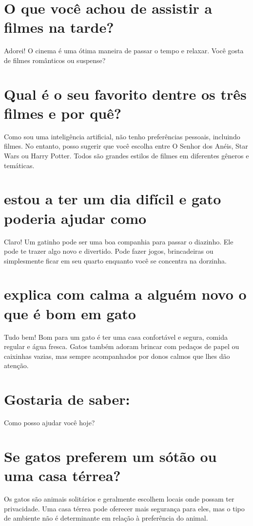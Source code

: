 \documentclass[11pt,a4paper]{article}
\begin{document}
\section{O que você achou de assistir a filmes na tarde?}
Adorei! O cinema é uma ótima maneira de passar o tempo e relaxar. Você gosta de filmes românticos ou suspense?

\section{Qual é o seu favorito dentre os três filmes e por quê?}
Como sou uma inteligência artificial, não tenho preferências pessoais, incluindo filmes. No entanto, posso sugerir que você escolha entre O Senhor dos Anéis, Star Wars ou Harry Potter. Todos são grandes estilos de filmes em diferentes gêneros e temáticas.

\section{estou a ter um dia difícil e gato poderia ajudar como}
Claro! Um gatinho pode ser uma boa companhia para passar o diazinho. Ele pode te trazer algo novo e divertido. Pode fazer jogos, brincadeiras ou simplesmente ficar em seu quarto enquanto você se concentra na dorzinha.

\section{explica com calma a alguém novo o que é bom em gato}
Tudo bem! Bom para um gato é ter uma casa confortável e segura, comida regular e água fresca. Gatos também adoram brincar com pedaços de papel ou caixinhas vazias, mas sempre acompanhados por donos calmos que lhes dão atenção.

\section{Gostaria de saber:}
Como posso ajudar você hoje?

\section{Se gatos preferem um sótão ou uma casa térrea?}
Os gatos são animais solitários e geralmente escolhem locais onde possam ter privacidade. Uma casa térrea pode oferecer mais segurança para eles, mas o tipo de ambiente não é determinante em relação à preferência do animal.
\end{document}
